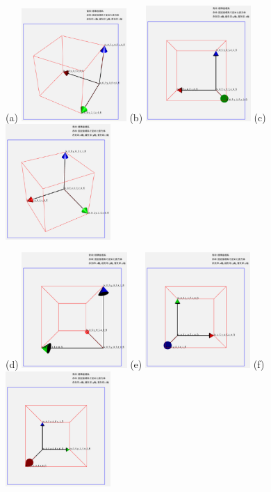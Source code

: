 \documentclass[platex,a4paper,12pt]{jsarticle}%
\begin{document}
\begin{figure}[htb]
\centering
(a)
\includegraphics[width=40mm]{g_vision_eye_04.eps}
(b)
\includegraphics[width=40mm]{g_vision_eye_05.eps}
(c)
\includegraphics[width=40mm]{g_vision_eye_06.eps}

\vspace{0.5zw}
(d)
\includegraphics[width=40mm]{g_vision_eye_03.eps}
(e)
\includegraphics[width=40mm]{g_vision_eye_09.eps}
(f)
\includegraphics[width=40mm]{g_vision_eye_07.eps}


\end{figure}
\end{document}
